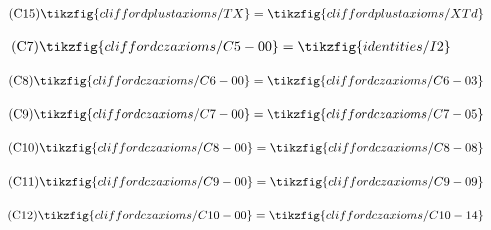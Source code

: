 \begin{figure}[ht]
{\begin{minipage}{.975\textwidth}
\begin{center}
        \begin{subfigure}{0.43\textwidth}
            \begin{align}\label{t-C15}\tag{C15}\tikzfig{cliffordplustaxioms/TX} = \tikzfig{cliffordplustaxioms/XTd}\end{align}
        \end{subfigure}
        \begin{subfigure}{0.28\textwidth}
            \begin{align}\label{t-C7}\tag{C7}\tikzfig{cliffordczaxioms/C5-00}=\tikzfig{identities/I2}\end{align}
        \end{subfigure}\vspace{-0.5em}
        \begin{subfigure}{0.32\textwidth}
            \begin{align}\label{t-C8}\tag{C8}\tikzfig{cliffordczaxioms/C6-00}=\tikzfig{cliffordczaxioms/C6-03}\end{align}
        \end{subfigure}
        \begin{subfigure}{0.32\textwidth}
            \begin{align}\label{t-C9}\tag{C9}\tikzfig{cliffordczaxioms/C7-00}=\tikzfig{cliffordczaxioms/C7-05}\end{align}
        \end{subfigure}\vspace{-0.5em}
        \begin{subfigure}{0.62\textwidth}
            \begin{align}\label{t-C10}\tag{C10}\tikzfig{cliffordczaxioms/C8-00}=\tikzfig{cliffordczaxioms/C8-08}\end{align}
        \end{subfigure}
        \begin{subfigure}{0.63\textwidth}
            \begin{align}\label{t-C11}\tag{C11}\tikzfig{cliffordczaxioms/C9-00}=\tikzfig{cliffordczaxioms/C9-09}\end{align}
        \end{subfigure}
        \begin{subfigure}{0.62\textwidth}
            \begin{align}\label{t-C12}\tag{C12}\tikzfig{cliffordczaxioms/C10-00}=\tikzfig{cliffordczaxioms/C10-14}\end{align}
        \end{subfigure}
        \begin{subfigure}{0.62\textwidth}

\end{subfigure}
\end{center}
\end{minipage}}
\end{figure}
